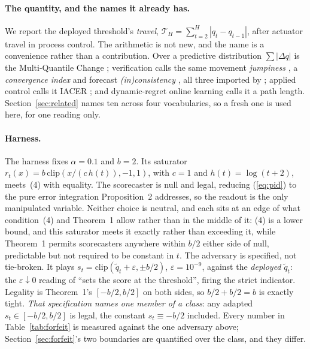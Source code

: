 \paragraph{The quantity, and the names it already has.} We report the deployed threshold's
\emph{travel}, $\mathcal{T}_H = \sum_{t=2}^{H}|q_t-q_{t-1}|$, after actuator travel in process
control. The arithmetic is not new, and the name is a convenience rather than a contribution.
Over a predictive distribution $\sum|\Delta q|$ is the
Multi-Quantile Change \citep[v3, \S3.4.1]{zanotti2026smqc}; verification calls the same movement
\emph{jumpiness} \citep{zsoter2009jumpiness}, a \emph{convergence index}
\citep{ehret2010convergence} and forecast \emph{(in)consistency}
\citep{pappenberger2011consistency}, all three imported by \citet{vanbelle2026stabilizing};
applied control calls it IACER \citep{sarhadi2025criteria}; and dynamic-regret online learning
calls it a path length.
Section~\ref{sec:related} names ten across four vocabularies, so a fresh one is used here, for one
reading only.

\paragraph{Harness.} The harness fixes $\alpha = 0.1$ and $b = 2$. Its saturator $r_t(x) =
b\,\mathrm{clip}(x/(c\,h(t)),-1,1)$, with $c = 1$ and $h(t) = \log(t+2)$, meets~(4) with equality.
The scorecaster is null and legal, reducing (\ref{eq:pid}) to the pure error integration
Proposition~2 addresses, so the readout is the only manipulated variable. Neither choice is
neutral, and each sits at an edge of what condition~(4) and Theorem~1 allow rather than in the
middle of it: (4) is a lower bound, and this saturator meets it exactly rather than exceeding it,
while Theorem~1 permits scorecasters anywhere within $b/2$ either side of null, predictable but
not required to be constant in $t$. The adversary is specified, not
tie-broken. It plays $s_t = \mathrm{clip}(\tilde{q}_t+\varepsilon,\pm b/2)$, $\varepsilon =
10^{-9}$, against the \emph{deployed} $\tilde{q}_t$: the $\varepsilon\downarrow 0$ reading of
``sets the score at the threshold'', firing the strict indicator. Legality is Theorem~1's
$[-b/2,b/2]$ on both sides, so $b/2+b/2 = b$ is exactly tight. \emph{That specification names one
member of a class}: any adapted $s_t \in [-b/2,b/2]$ is legal, the constant $s_t \equiv -b/2$
included. Every number in Table~\ref{tab:forfeit} is measured against the
one adversary above;
Section~\ref{sec:forfeit}'s two boundaries are quantified over the class, and they differ.
